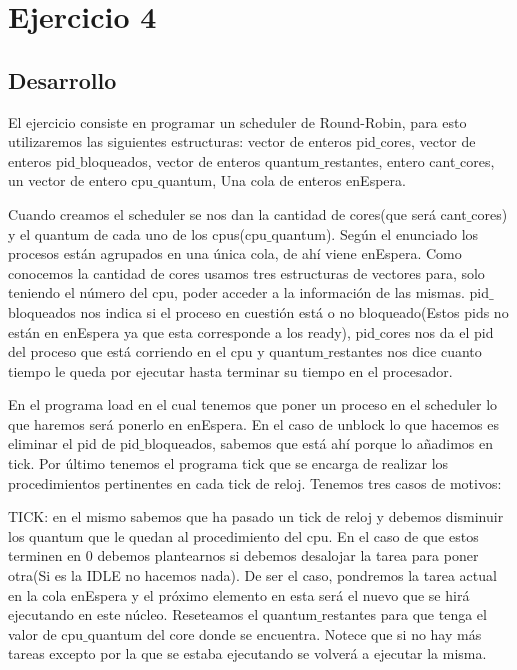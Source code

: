 \section{Ejercicio 4}

\subsection{Desarrollo}

El ejercicio consiste en programar un scheduler de Round-Robin, para esto utilizaremos las siguientes estructuras: vector de enteros pid$\_$cores, vector de enteros pid$\_$bloqueados, 
vector de enteros quantum$\_$restantes, entero cant$\_$cores, un vector de entero cpu$\_$quantum, Una cola de enteros enEspera.

Cuando creamos el scheduler se nos dan la cantidad de cores(que será cant$\_$cores) y el quantum de cada uno de los cpus(cpu$\_$quantum). Según el enunciado los procesos están agrupados 
en una única cola, de ahí viene enEspera. Como conocemos la cantidad de cores usamos tres estructuras de vectores para, solo teniendo el número del cpu, poder acceder a la 
información de las mismas. pid$\_$bloqueados nos indica si el proceso en cuestión está o no bloqueado(Estos pids no están en enEspera ya que esta corresponde a los
ready), pid$\_$cores nos da el pid del proceso que está corriendo en el cpu y quantum$\_$restantes nos dice cuanto tiempo le queda por ejecutar hasta terminar su tiempo en el 
procesador.

En el programa load en el cual tenemos que poner un proceso en el scheduler lo que haremos será ponerlo en enEspera. En el caso de unblock lo que hacemos es eliminar el pid de 
pid$\_$bloqueados, sabemos que está ahí porque lo añadimos en tick. Por último tenemos el programa tick que se encarga de realizar los procedimientos pertinentes en cada tick de reloj. Tenemos tres casos de motivos:
 
TICK: en el mismo sabemos que ha pasado un tick de reloj y debemos disminuir los quantum que le quedan al procedimiento del cpu. En el caso de que estos terminen en 0 debemos 
plantearnos si debemos desalojar la tarea para poner otra(Si es la IDLE no hacemos nada). De ser el caso, pondremos la tarea actual en la cola enEspera y el próximo elemento
en esta será el nuevo que se hirá ejecutando en este núcleo. Reseteamos el quantum$\_$restantes para que tenga el valor de cpu$\_$quantum del core donde se encuentra. Notece que si no hay más tareas
excepto por la que se estaba ejecutando se volverá a ejecutar la misma.

